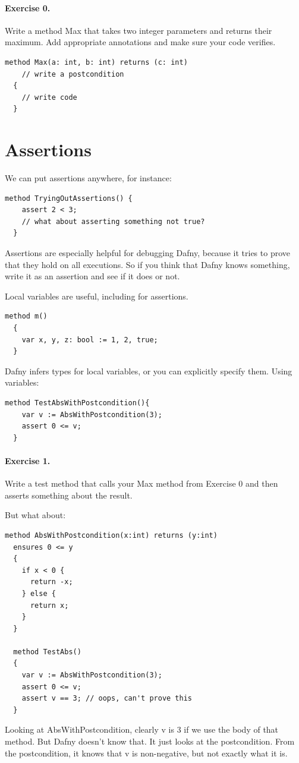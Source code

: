 \documentclass[11pt]{article}
\begin{document}
\paragraph{Exercise 0.} Write a method \textsf{Max} that takes two
integer parameters and returns their maximum. Add appropriate annotations
and make sure your code verifies.

\begin{lstlisting}[language=dafny]
  method Max(a: int, b: int) returns (c: int)
    // write a postcondition
  {
    // write code
  }
\end{lstlisting}

\section*{Assertions}
We can put assertions anywhere, for instance:
\begin{lstlisting}[language=dafny]
  method TryingOutAssertions() {
    assert 2 < 3;
    // what about asserting something not true?
  }
\end{lstlisting}
Assertions are especially helpful for debugging Dafny, because it tries to prove that they hold
on all executions. So if you think that Dafny knows something, write it as an assertion and see
if it does or not.

Local variables are useful, including for assertions.
\begin{lstlisting}[language=dafny]
  method m()
  {
    var x, y, z: bool := 1, 2, true;
  }
\end{lstlisting}
Dafny infers types for local variables, or you can explicitly specify them. Using variables:
\begin{lstlisting}[language=dafny]
  method TestAbsWithPostcondition(){
    var v := AbsWithPostcondition(3);
    assert 0 <= v;
  }
\end{lstlisting}

\paragraph{Exercise 1.} Write a test method that calls your \textsf{Max} method from Exercise 0
and then asserts something about the result.

But what about:
\begin{lstlisting}[language=dafny]
  method AbsWithPostcondition(x:int) returns (y:int)
  ensures 0 <= y
  {
    if x < 0 {
      return -x;
    } else {
      return x;
    }
  }

  method TestAbs()
  {
    var v := AbsWithPostcondition(3);
    assert 0 <= v;
    assert v == 3; // oops, can't prove this
  }
\end{lstlisting}
Looking at \textsf{AbsWithPostcondition}, clearly \textsf{v} is 3 if we use the body of that method.
But Dafny doesn't know that. It just looks at the postcondition. From the postcondition, it knows
that \textsf{v} is non-negative, but not exactly what it is.
\end{document}
